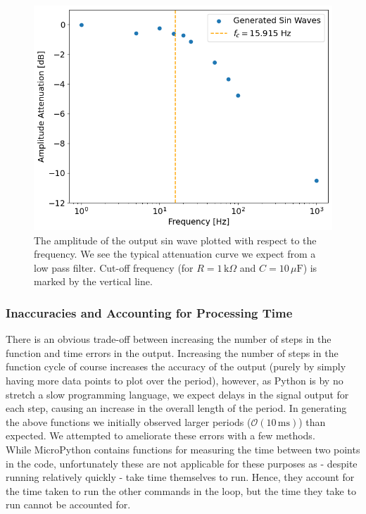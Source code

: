 \documentclass[%
 reprint,
 amsmath,amssymb,
 aps,
]{revtex4-2}
\begin{document}
        \begin{figure}
            \includegraphics[width=0.9\columnwidth]{Images/attenuation.png}
            \caption{\label{fig:attenuation}The amplitude of the output sin wave plotted with respect to the frequency. We see the typical attenuation curve we expect from a low pass filter. Cut-off frequency (for $R=1\,\text{k}\Omega$ and $C=10\,\mu\text{F}$) is marked by the vertical line.}
        \end{figure}


        \subsubsection{Inaccuracies and Accounting for Processing Time}
        There is an obvious trade-off between increasing the number of steps in the function and time errors in the output. Increasing the number of steps in the function cycle of course increases the accuracy of the output (purely by simply having more data points to plot over the period), however, as Python is by no stretch a slow programming language, we expect delays in the signal output for each step, causing an increase in the overall length of the period. In generating the above functions we initially observed larger periods ($\mathcal{O}(10\,\text{ms})$) than expected. We attempted to ameliorate these errors with a few methods.\\

        While MicroPython contains functions for measuring the time between two points in the code, unfortunately these are not applicable for these purposes as - despite running relatively quickly - take time themselves to run. Hence, they account for the time taken to run the other commands in the loop, but the time they take to run cannot be accounted for.\\
\end{document}
